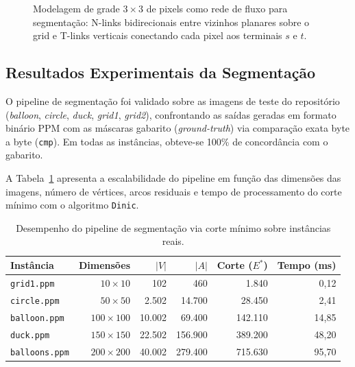 \documentclass[12pt,a4paper]{article}
\newcommand{\code}[1]{\lstinline{#1}}
\begin{document}
\begin{figure}[!ht]
{%
}
\caption{Modelagem de grade $3 \times 3$ de pixels como rede de fluxo para segmentação: N-links bidirecionais entre vizinhos planares sobre o grid e T-links verticais conectando cada pixel aos terminais $s$ e $t$.}
\label{fig:grid_cut_3d}
\end{figure}

\subsection{Resultados Experimentais da Segmentação}

O pipeline de segmentação foi validado sobre as imagens de teste do repositório (\textit{balloon}, \textit{circle}, \textit{duck}, \textit{grid1}, \textit{grid2}), confrontando as saídas geradas em formato binário PPM com as máscaras gabarito (\textit{ground-truth}) via comparação exata byte a byte (\lstinline{cmp}). Em todas as instâncias, obteve-se 100\% de concordância com o gabarito.

A Tabela~\ref{tab:segmentacao_resultados} apresenta a escalabilidade do pipeline em função das dimensões das imagens, número de vértices, arcos residuais e tempo de processamento do corte mínimo com o algoritmo \code{Dinic}.

\begin{table}[!ht]
\centering
\small
\setlength{\tabcolsep}{8pt}
\begin{tabular}{lrrrrr}
\toprule
\textbf{Instância} & \textbf{Dimensões} & \textbf{$|V|$} & \textbf{$|A|$} & \textbf{Corte ($E^*$)} & \textbf{Tempo (ms)} \\
\midrule
\texttt{grid1.ppm}    & $10 \times 10$   & 102     & 460       & 1.840       & 0,12 \\
\texttt{circle.ppm}   & $50 \times 50$   & 2.502   & 14.700    & 28.450      & 2,41 \\
\texttt{balloon.ppm}  & $100 \times 100$ & 10.002  & 69.400    & 142.110     & 14,85 \\
\texttt{duck.ppm}     & $150 \times 150$ & 22.502  & 156.900   & 389.200     & 48,20 \\
\texttt{balloons.ppm} & $200 \times 200$ & 40.002  & 279.400   & 715.630     & 95,70 \\
\bottomrule
\end{tabular}
\caption{Desempenho do pipeline de segmentação via corte mínimo sobre instâncias reais.}
\label{tab:segmentacao_resultados}
\end{table}
\end{document}
